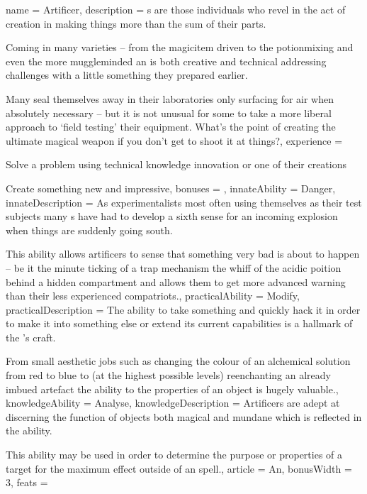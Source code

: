 \archetype
{
	name = Artificer,
	description = {\bname{}}s are those individuals who revel in the act of creation\comma{} in making things more than the sum of their parts. 

Coming in many varieties – from the magic\minus{}item driven  to the potion\minus{}mixing  and even the more muggle\minus{}minded \comma{} an  is both creative and technical\comma{} addressing challenges with a little something they prepared earlier. 

Many  seal themselves away in their laboratories\comma{} only surfacing for air when absolutely necessary – but it is not unusual for some to take a more liberal approach to `field testing’ their equipment. What’s the point of creating the ultimate magical weapon if you don’t get to shoot it at things?,
	experience = \item Solve a problem using technical knowledge\comma{} innovation or one of their creations
\item Create something new and impressive,
	bonuses = 
,
	innateAbility = Danger,
	innateDescription = As experimentalists\comma{} most often using themselves as their test subjects\comma{} many {\bname{}}s have had to develop a sixth sense for an incoming explosion when things are suddenly going south. 

This ability allows artificers to sense that something very bad is about to happen – be it the minute ticking of a trap mechanism\comma{} the whiff of the acidic poition behind a hidden compartment\comma{} and allows them to get more advanced warning than their less experienced compatriots.,
	practicalAbility = Modify,
	practicalDescription = The ability to take something and quickly hack it in order to make it into something else\comma{} or extend its current capabilities\comma{} is a hallmark of the \bname{}’s craft. 

From small aesthetic jobs\comma{} such as changing the colour of an alchemical solution from red to blue\comma{} to (at the highest possible levels)\comma{} re\minus{}enchanting an already imbued artefact\comma{} the ability to  the properties of an object is hugely valuable.,
	knowledgeAbility = Analyse,
	knowledgeDescription = Artificers are adept at discerning the function of objects\comma{} both magical and mundane\comma{} which is reflected in the  ability. 

This ability may be used in order to determine the purpose or properties of a target for the maximum effect outside of an  spell.,
	article = An,
	bonusWidth = 3, feats = \ArtificerFeats
}


